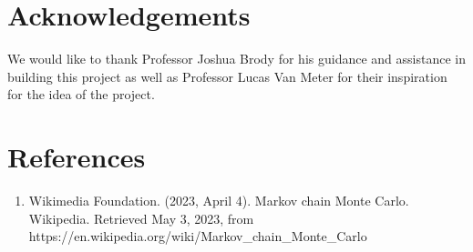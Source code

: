 \documentclass[11pt]{article}
\begin{document}
\section*{Acknowledgements}
We would like to thank Professor Joshua Brody for his guidance and assistance in building this project 
as well as Professor Lucas Van Meter for their inspiration for the idea of the project.

\section*{References}
\begin{enumerate}
    \item Wikimedia Foundation. (2023, April 4). Markov chain Monte Carlo. Wikipedia. Retrieved May 3, 2023, from https://en.wikipedia.org/wiki/Markov\_chain\_Monte\_Carlo 
\end{enumerate}
\end{document}
